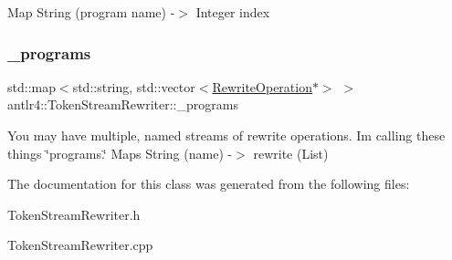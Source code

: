Map String (program name) -\/$>$ Integer index 

\mbox{\label{classantlr4_1_1TokenStreamRewriter_a6aebd86281a8c9878042e380217dd99a}} 
\subsubsection{\texorpdfstring{\+\_\+programs}{\_programs}}
{\footnotesize\ttfamily std\+::map$<$std\+::string, std\+::vector$<$\hyperlink{classantlr4_1_1TokenStreamRewriter_1_1RewriteOperation}{Rewrite\+Operation}$\ast$$>$ $>$ antlr4\+::\+Token\+Stream\+Rewriter\+::\+\_\+programs\hspace{0.3cm}{\ttfamily [protected]}}

You may have multiple, named streams of rewrite operations. I\textquotesingle{}m calling these things \char`\"{}programs.\char`\"{} Maps String (name) -\/$>$ rewrite (List) 

The documentation for this class was generated from the following files\+:\begin{DoxyCompactItemize}
\item 
Token\+Stream\+Rewriter.\+h\item 
Token\+Stream\+Rewriter.\+cpp\end{DoxyCompactItemize}

